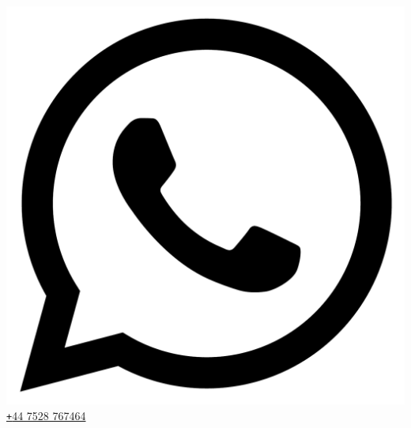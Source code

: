 \documentclass[10pt]{article} %
\begin{document}
{  \includegraphics[scale=0.014, trim = 0mm 25mm 0mm 0mm]{whatsapp.pdf}
  \href{tel:+447528767464}{\texttt{+}44 7528 767464}
}
\vspace{-5pt}

\end{document}
